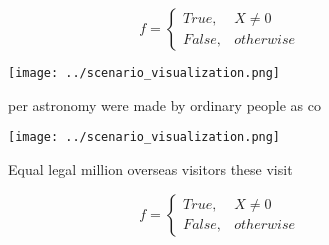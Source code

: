 \documentclass[a4paper]{article}
\begin{document}
\begin{equation}   f =
\begin{cases} True, & X \neq 0\\
False, & otherwise
\end{cases}
\end{equation}

\begin{figure}
\centering
\texttt{[image: ../scenario\_visualization.png]}
\caption{ per astronomy were made by ordinary people as co
}
\end{figure}
 
\begin{figure}
\centering
\texttt{[image: ../scenario\_visualization.png]}
\caption{Equal legal million overseas visitors these visit
}
\end{figure}
 
\begin{equation}   f =
\begin{cases} True, & X \neq 0\\
False, & otherwise
\end{cases}
\end{equation}
\end{document}
